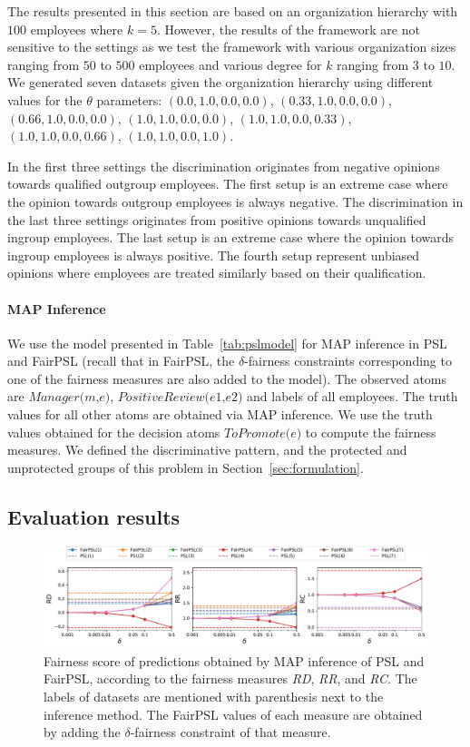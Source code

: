 \documentclass[11pt]{article}
\begin{document}
The results presented in this section are based on an organization hierarchy  with $100$ employees where $k=5$. However, the results of the framework are not sensitive to the settings as we test the framework with various organization sizes ranging from $50$ to $500$ employees and various degree for $k$ ranging from $3$ to $10$. We generated seven datasets given the organization hierarchy using different values for the $\theta$ parameters: $(0.0,1.0,0.0,0.0)$, $(0.33,1.0,0.0,0.0)$, $(0.66,1.0,0.0,0.0)$, $(1.0,1.0,0.0,0.0)$, $(1.0,1.0,0.0,0.33)$, $(1.0,1.0,0.0,0.66)$, $(1.0,1.0,0.0,1.0)$. 
 
In the first three settings the discrimination originates from negative opinions towards qualified outgroup employees. The first setup is an extreme case where the opinion towards outgroup employees is always negative. The discrimination in the last three settings originates from positive opinions towards unqualified ingroup employees. The last setup is an extreme case where the opinion towards ingroup employees is always positive. The fourth setup represent unbiased opinions where employees are treated similarly based on their qualification. 

\paragraph{MAP Inference} We use the model presented in Table~\ref{tab:pslmodel} for MAP inference in PSL and FairPSL (recall that in FairPSL, the $\delta$-fairness constraints corresponding to one of the fairness measures are also added to the model). The observed atoms are $\textit{Manager(m,e)}$, $\textit{PositiveReview(e1,e2)}$ and labels of all employees. The truth values for all other atoms are obtained via MAP inference. We use the truth values obtained for the decision atoms $\textit{ToPromote(e)}$ to compute the fairness measures. We defined the discriminative pattern, and the protected and unprotected groups of this problem in Section~\ref{sec:formulation}.


\subsection{Evaluation results}

\begin{figure}
\includegraphics[width=1\linewidth]{figs/results_vis_uni_params.pdf}
\caption{\small Fairness score of predictions obtained by MAP inference of PSL and FairPSL, according to the fairness measures \emph{RD}, \emph{RR}, and \emph{RC}. The labels of datasets are mentioned with parenthesis next to the inference method. The FairPSL values of each measure are obtained by adding the $\delta$-fairness constraint of that measure.\label{fig:results}
}  
\end{figure}
\end{document}
